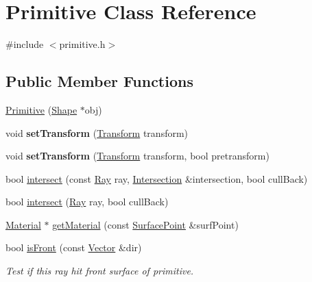 \hypertarget{class_primitive}{}\section{Primitive Class Reference}
\label{class_primitive}


{\ttfamily \#include $<$primitive.\+h$>$}

\subsection*{Public Member Functions}
\begin{DoxyCompactItemize}
\item 
\mbox{\hyperlink{class_primitive_aa469be6577bcf2c249a47c6e44608155}{Primitive}} (\mbox{\hyperlink{class_shape}{Shape}} $\ast$obj)
\item 
\mbox{\label{class_primitive_a1e75da88b15d7b662cc00214770af06b}} 
void {\bfseries set\+Transform} (\mbox{\hyperlink{class_transform}{Transform}} transform)
\item 
\mbox{\label{class_primitive_a47dd397f6cc26ef6bf797446ab50e302}} 
void {\bfseries set\+Transform} (\mbox{\hyperlink{class_transform}{Transform}} transform, bool pretransform)
\item 
bool \mbox{\hyperlink{class_primitive_adfe14a385e39f9e86ff31e659e3ed958}{intersect}} (const \mbox{\hyperlink{class_ray}{Ray}} ray, \mbox{\hyperlink{class_intersection}{Intersection}} \&intersection, bool cull\+Back)
\item 
bool \mbox{\hyperlink{class_primitive_ad92af2f561d08da5c74d539ce88b9ce4}{intersect}} (\mbox{\hyperlink{class_ray}{Ray}} ray, bool cull\+Back)
\item 
\mbox{\hyperlink{class_material}{Material}} $\ast$ \mbox{\hyperlink{class_primitive_acf807003abb52d3224dda7a476f71d96}{get\+Material}} (const \mbox{\hyperlink{class_surface_point}{Surface\+Point}} \&surf\+Point)
\item 
\mbox{\label{class_primitive_a63fa989ab99215b487782d4085021a75}} 
bool \mbox{\hyperlink{class_primitive_a63fa989ab99215b487782d4085021a75}{is\+Front}} (const \mbox{\hyperlink{struct_vector}{Vector}} \&dir)
\begin{DoxyCompactList}\small\item\em Test if this ray hit front surface of primitive. \end{DoxyCompactList}\end{DoxyCompactItemize}
